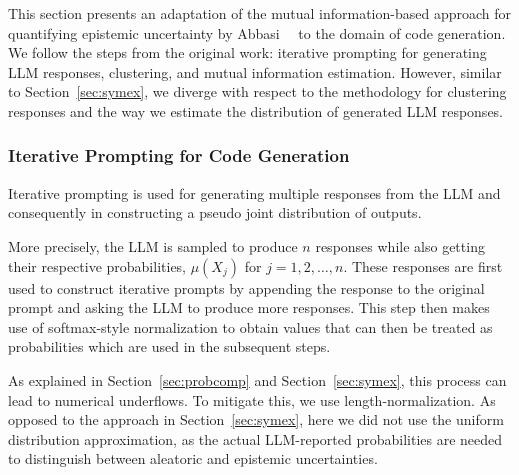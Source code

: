 This section presents an adaptation of the mutual information-based approach for quantifying epistemic uncertainty by Abbasi~\etal~\cite{abbasi2024believe} to the domain of code generation.
We follow the steps from the original work: iterative prompting for generating LLM responses, clustering, and mutual information estimation. 
However, similar to Section~\ref{sec:symex}, we diverge with respect to the methodology for clustering responses and the way we estimate the distribution of generated LLM responses.

\subsubsection{Iterative Prompting for Code Generation}
Iterative prompting is used for generating multiple responses from the LLM and consequently in constructing a pseudo joint distribution of outputs. 


More precisely, the LLM is sampled to produce $n$ responses while also getting their respective probabilities, $\mu(X_j)$ for \(j = 1, 2, \ldots, n\).
These responses are first used to construct iterative prompts by appending the response to the original prompt and asking the LLM to produce more responses. 
This step then makes use of softmax-style normalization to obtain values that can then be treated as probabilities which are used in the subsequent steps.  

As explained in Section~\ref{sec:probcomp} and Section~\ref{sec:symex}, this process can lead to numerical underflows. 
To mitigate this, we use length-normalization.
As opposed to the approach in Section~\ref{sec:symex}, here we did not use the uniform distribution approximation, as the actual LLM-reported probabilities are needed to distinguish between aleatoric and epistemic uncertainties.
%

